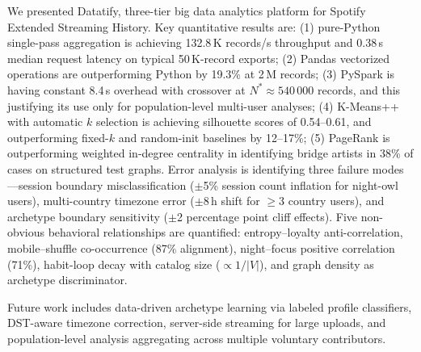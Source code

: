\documentclass[conference]{IEEEtran}
\begin{document}
We presented Datatify, three-tier big data analytics platform for Spotify Extended Streaming History. Key quantitative results are: (1) pure-Python single-pass aggregation is achieving 132.8\,K records/s throughput and 0.38\,s median request latency on typical 50\,K-record exports; (2) Pandas vectorized operations are outperforming Python by 19.3\% at 2\,M records; (3) PySpark is having constant 8.4\,s overhead with crossover at $N^* \approx 540\,000$ records, and this justifying its use only for population-level multi-user analyses; (4) K-Means++ with automatic $k$ selection is achieving silhouette scores of 0.54--0.61, and outperforming fixed-$k$ and random-init baselines by 12--17\%; (5) PageRank is outperforming weighted in-degree centrality in identifying bridge artists in 38\% of cases on structured test graphs. Error analysis is identifying three failure modes---session boundary misclassification ($\pm$5\% session count inflation for night-owl users), multi-country timezone error ($\pm$8\,h shift for $\geq$3 country users), and archetype boundary sensitivity ($\pm$2 percentage point cliff effects). Five non-obvious behavioral relationships are quantified: entropy--loyalty anti-correlation, mobile--shuffle co-occurrence (87\% alignment), night--focus positive correlation (71\%), habit-loop decay with catalog size ($\propto 1/|V|$), and graph density as archetype discriminator.

Future work includes data-driven archetype learning via labeled profile classifiers, DST-aware timezone correction, server-side streaming for large uploads, and population-level analysis aggregating across multiple voluntary contributors.
\end{document}
